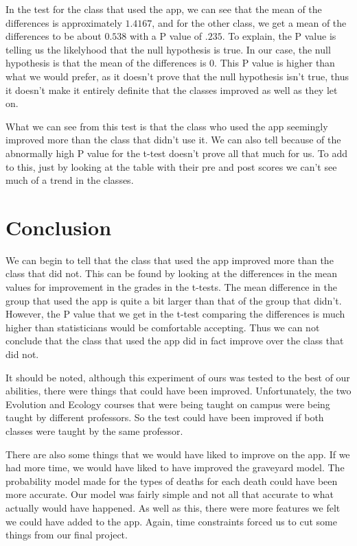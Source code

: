 \documentclass[titlepage]{article}\usepackage[]{graphicx}\usepackage[]{color}
\begin{document}
In the test for the class that used the app, we can see that the mean of the differences is approximately \(1.4167\), and for the other class, we get a mean of the differences to be about \(0.538\) with a P value of \(.235\). To explain, the P value is telling us the likelyhood that the null hypothesis is true. In our case, the null hypothesis is that the mean of the differences is \(0\). This P value is higher than what we would prefer, as it doesn't prove that the null hypothesis isn't true, thus it doesn't make it entirely definite that the classes improved as well as they let on. 

What we can see from this test is that the class who used the app seemingly improved more than the class that didn't use it. We can also tell because of the abnormally high P value for the t-test doesn't prove all that much for us. To add to this, just by looking at the table with their pre and post scores we can't see much of a trend in the classes. 














\section{Conclusion}

We can begin to tell that the class that used the app improved more than the class that did not. This can be found by looking at the differences in the mean values for improvement in the grades in the t-tests. The mean difference in the group that used the app is quite a bit larger than that of the group that didn't. However, the P value that we get in the t-test comparing the differences is much higher than statisticians would be comfortable accepting. Thus we can not conclude that the class that used the app did in fact improve over the class that did not. 

It should be noted, although this experiment of ours was tested to the best of our abilities, there were things that could have been improved. Unfortunately, the two Evolution and Ecology courses that were being taught on campus were being taught by different professors. So the test could have been improved if both classes were taught by the same professor. 

There are also some things that we would have liked to improve on the app. If we had more time, we would have liked to have improved the graveyard model. The probability model made for the types of deaths for each death could have been more accurate. Our model was fairly simple and not all that accurate to what actually would have happened. As well as this, there were more features we felt we could have added to the app. Again, time constraints forced us to cut some things from our final project. 
\end{document}
